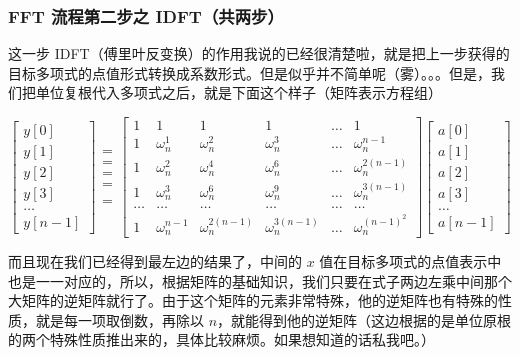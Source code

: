 \subsubsection{FFT 流程第二步之 IDFT（共两步）}

这一步 IDFT（傅里叶反变换）的作用我说的已经很清楚啦，就是把上一步获得的目标多项式的点值形式转换成系数形式。但是似乎并不简单呢（雾）。。。但是，我们把单位复根代入多项式之后，就是下面这个样子（矩阵表示方程组）

$$
 \begin{bmatrix}y[0] \\ y[1] \\ y[2] \\ y[3] \\ \dots \\ y[n-1] \end{bmatrix}
\begin{matrix}= \\ = \\ = \\ = \\ \\ = \end{matrix}
\begin{bmatrix}1 & 1 & 1 & 1 & \dots & 1 \\
1 & \omega_n^1 & \omega_n^2 & \omega_n^3 & \dots & \omega_n^{n-1} \\
1 & \omega_n^2 & \omega_n^4 & \omega_n^6 & \dots & \omega_n^{2(n-1)} \\
1 & \omega_n^3 & \omega_n^6 & \omega_n^9 & \dots & \omega_n^{3(n-1)} \\
\dots & \dots & \dots & \dots & \dots & \dots \\
1 & \omega_n^{n-1} & \omega_n^{2(n-1)} & \omega_n^{3(n-1)} & \dots & \omega_n^{(n-1)^2} \end{bmatrix}
\begin{bmatrix} a[0] \\ a[1] \\ a[2] \\ a[3] \\ \dots \\ a[n-1] \end{bmatrix} 
$$

而且现在我们已经得到最左边的结果了，中间的 $x$ 值在目标多项式的点值表示中也是一一对应的，所以，根据矩阵的基础知识，我们只要在式子两边左乘中间那个大矩阵的逆矩阵就行了。由于这个矩阵的元素非常特殊，他的逆矩阵也有特殊的性质，就是每一项取倒数，再除以 $n$，就能得到他的逆矩阵（这边根据的是单位原根的两个特殊性质推出来的，具体比较麻烦。如果想知道的话私我吧。）

